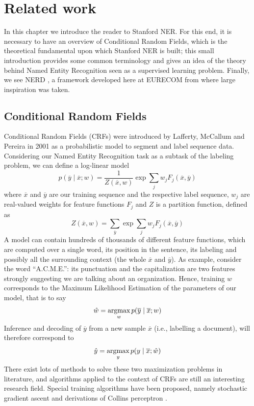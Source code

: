 \documentclass[a4paper,11pt]{report}
\newcommand{\argmax}{\operatornamewithlimits{argmax}}
\begin{document}
\chapter{Related work}
In this chapter we introduce the reader to Stanford NER. For this end, it is necessary to have an overview of Conditional Random Fields, which is the theoretical fundamental upon which Stanford NER is built; this small introduction provides some common terminology and gives an idea of the theory behind Named Entity Recognition seen as a supervised learning problem. Finally, we see NERD \cite{rizzo2012nerd}, a framework developed here at EURECOM from where large inspiration was taken.
\section{Conditional Random Fields}
\label{sec:crfs}
Conditional Random Fields (CRFs) were introduced by Lafferty, McCallum and Pereira in 2001\cite{lafferty2001conditional} as a probabilistic model to segment and label sequence data. Considering our Named Entity Recognition task as a subtask of the labeling problem, we can define a log-linear model
$$
p(\overline{y} \mid \overline{x}; w) = \frac{1}{Z(\overline{x}, w)}\exp\sum\limits_j w_jF_j(\overline{x}, \overline{y})
$$
where $\overline{x}$ and $\overline{y}$ are our training sequence and the respective label sequence, $w_j$ are real-valued weights for feature functions $F_j$ and $Z$ is a partition function, defined as
$$
Z(\overline{x}, w) = \sum\limits_{\overline{y}}\exp\sum\limits_j w_jF_j(\overline{x}, \overline{y})
$$
A model can contain hundreds of thousands of different feature functions, which are computed over a single word, its position in the sentence, its labeling and possibly all the surrounding context (the whole $\overline{x}$ and $\overline{y}$). As example, consider the word ``A.C.M.E.'': its punctuation and the capitalization are two features strongly suggesting we are talking about an organization.
Hence, training $w$ corresponds to the Maximum Likelihood Estimation of the parameters of our model, that is to say
$$
\hat{w} = \argmax_w p(\overline{y} \mid \overline{x}; w)
$$
Inference and decoding of $\overline{y}$ from a new sample $\overline{x}$ (i.e., labelling a document), will therefore correspond to
$$
\hat{y} = \argmax_y p(y \mid \overline{x}; \hat{w})
$$
There exist lots of methods to solve these two maximization problems in literature, and algorithms applied to the context of CRFs are still an interesting research field. Special training algorithms have been proposed, namely stochastic gradient ascent and derivations of Collins perceptron \cite{elkan2008log}.
\end{document}
